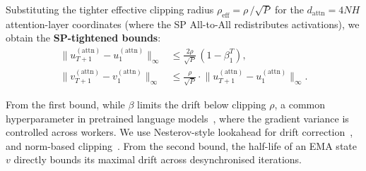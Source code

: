 \documentclass{article}
\begin{document}
Substituting the tighter effective clipping radius
$\rho_{\text{eff}} = \rho\,/\sqrt{P}$ for the
$d_{\text{attn}} = 4NH$ attention-layer coordinates (where the SP All-to-All redistributes activations), we obtain the \textbf{SP-tightened bounds}:
\begin{align}
\bigl\|u_{T+1}^{(\text{attn})} - u_1^{(\text{attn})}\bigr\|_\infty
&\leq \frac{2\rho}{\sqrt{P}}\,(1 - \beta_1^T), \label{eq:drift_u_sp} \\
\bigl\|v_{T+1}^{(\text{attn})} - v_1^{(\text{attn})}\bigr\|_\infty
&\leq \frac{\rho}{\sqrt{P}} \cdot \bigl\|u_{T+1}^{(\text{attn})} - u_1^{(\text{attn})}\bigr\|_\infty. \label{eq:drift_v_sp}
\end{align}


From the first bound, while $\beta$ limits the drift below clipping $\rho$, a common hyperparameter in pretrained
language models~\citep{brown2020languagemodelsfewshotlearners,workshop2023bloom176bparameteropenaccessmultilingual}, where the gradient variance is controlled across workers. We use
Nesterov-style lookahead for drift correction~\citep{pmlr-v28-sutskever13,taniguchi2024adoptmodifiedadamconverge}, and
norm-based clipping~\citep{pascanu2013difficultytrainingrecurrentneural,brown2020languagemodelsfewshotlearners}. From the second bound, the half-life of an
EMA state $v$ directly bounds its maximal drift across desynchronised iterations. 


\end{document}
